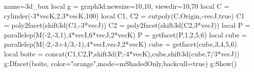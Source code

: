 \documentclass[10pt]{standalone}%
\begin{document}
\begin{luadraw}{name=3d_box}
local g = graph3d:new{size={10,10}, viewdir={10,70}}
local C = cylinder(-3*vecK,2,3*vecK,100)
local C1, C2 = cutpoly(C,{Origin,-vecJ},true)
C1 = poly2facet(shift3d(C1,-3*vecJ))
C2 = poly2facet(shift3d(C2,3*vecJ))
local P = parallelep(M(-2,-3,1),4*vecI,6*vecJ,2*vecK)
P = getfacet(P,{1,2,5,6})
local cube = parallelep(M(-2,-3+4/3,-1),4*vecI,vecJ,2*vecK)
cube = getfacet(cube,{3,4,5,6})
local boite = concat(C1,C2,P,shift3d(P,-4*vecK),cube,shift3d(cube,7/3*vecJ))
g:Dfacet(boite, {color="orange",mode=mShadedOnly,backcull=true})
g:Show()
\end{luadraw}
\end{document}
